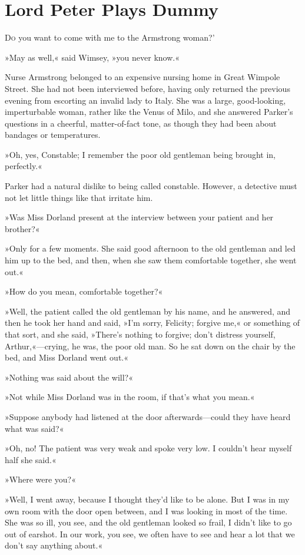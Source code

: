 \chapter{Lord Peter Plays Dummy}
\lettrine[lines=4,ante=‘]{D}{o} you want to come with me to the Armstrong woman?'

\zz
»May as well,« said Wimsey, »you never know.«

\zz
Nurse Armstrong belonged to an expensive nursing home in Great Wimpole Street. She had not been interviewed before, having only returned the previous evening from escorting an invalid lady to Italy. She was a large, good-looking, imperturbable woman, rather like the Venus of Milo, and she answered Parker's questions in a cheerful, matter-of-fact tone, as though they had been about bandages or temperatures.

»Oh, yes, Constable; I remember the poor old gentleman being brought in, perfectly.«

Parker had a natural dislike to being called constable. However, a detective must not let little things like that irritate him.

»Was Miss Dorland present at the interview between your patient and her brother?«

»Only for a few moments. She said good afternoon to the old gentleman and led him up to the bed, and then, when she saw them comfortable together, she went out.«

»How do you mean, comfortable together?«

»Well, the patient called the old gentleman by his name, and he answered, and then he took her hand and said, »I'm sorry, Felicity; forgive me,« or something of that sort, and she said, »There's nothing to forgive; don't distress yourself, Arthur,«---crying, he was, the poor old man. So he sat down on the chair by the bed, and Miss Dorland went out.«

»Nothing was said about the will?«

»Not while Miss Dorland was in the room, if that's what you mean.«

»Suppose anybody had listened at the door afterwards\allowbreak---\allowbreak could they have heard what was said?«

»Oh, no! The patient was very weak and spoke very low. I couldn't hear myself half she said.«

»Where were you?«

»Well, I went away, because I thought they'd like to be alone. But I was in my own room with the door open between, and I was looking in most of the time. She was so ill, you see, and the old gentleman looked so frail, I didn't like to go out of earshot. In our work, you see, we often have to see and hear a lot that we don't say anything about.«

